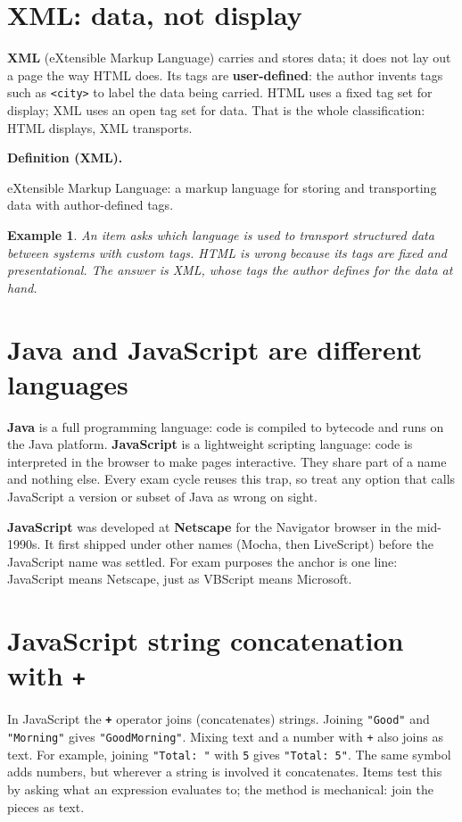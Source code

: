 \documentclass[11pt]{article}
\newtheorem{example}{Example}[section]
\newenvironment{definitionbox}[1]{%
  \par\noindent\textbf{Definition (#1).}\ \itshape
}{\par\vspace{0.3em}}
\begin{document}
\section{XML: data, not display}
\textbf{XML} (eXtensible Markup Language) carries and stores data; it does not lay out a page the way HTML does. Its tags are \textbf{user-defined}: the author invents tags such as \texttt{<city>} to label the data being carried. HTML uses a fixed tag set for display; XML uses an open tag set for data. That is the whole classification: HTML displays, XML transports.

\begin{definitionbox}{XML}
eXtensible Markup Language: a markup language for storing and transporting data with author-defined tags.
\end{definitionbox}

\begin{example}
An item asks which language is used to transport structured data between systems with custom tags. HTML is wrong because its tags are fixed and presentational. The answer is XML, whose tags the author defines for the data at hand.
\end{example}

\section{Java and JavaScript are different languages}
\textbf{Java} is a full programming language: code is compiled to bytecode and runs on the Java platform. \textbf{JavaScript} is a lightweight scripting language: code is interpreted in the browser to make pages interactive. They share part of a name and nothing else. Every exam cycle reuses this trap, so treat any option that calls JavaScript a version or subset of Java as wrong on sight.

\textbf{JavaScript} was developed at \textbf{Netscape} for the Navigator browser in the mid-1990s. It first shipped under other names (Mocha, then LiveScript) before the JavaScript name was settled. For exam purposes the anchor is one line: JavaScript means Netscape, just as VBScript means Microsoft.

\section{JavaScript string concatenation with \texttt{+}}
In JavaScript the \textbf{\texttt{+}} operator joins (concatenates) strings. Joining \texttt{"Good"} and \texttt{"Morning"} gives \texttt{"GoodMorning"}. Mixing text and a number with \texttt{+} also joins as text. For example, joining \texttt{"Total: "} with \texttt{5} gives \texttt{"Total: 5"}. The same symbol adds numbers, but wherever a string is involved it concatenates. Items test this by asking what an expression evaluates to; the method is mechanical: join the pieces as text.
\end{document}
